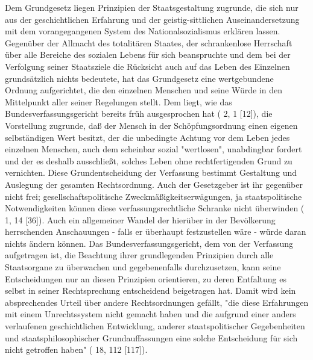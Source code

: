 \documentclass[12pt]{article}
\begin{document}
\syncleft
\begin{sourcepara}
Dem Grundgesetz liegen Prinzipien der Staatsgestaltung zugrunde, die sich nur aus der geschichtlichen Erfahrung und der geistig-sittlichen Auseinandersetzung mit dem vorangegangenen System des Nationalsozialismus erklären lassen. Gegenüber der Allmacht des totalitären Staates, der schrankenlose Herrschaft über alle Bereiche des sozialen Lebens für sich beanspruchte und dem bei der Verfolgung seiner Staatsziele die Rücksicht auch auf das Leben des Einzelnen grundsätzlich nichts bedeutete, hat das Grundgesetz eine wertgebundene Ordnung aufgerichtet, die den einzelnen Menschen und seine Würde in den Mittelpunkt aller seiner Regelungen stellt. Dem liegt, wie das Bundesverfassungsgericht bereits früh ausgesprochen hat (\abbrBVerfGE{} 2, 1 [12]), die Vorstellung zugrunde, daß der Mensch in der Schöpfungsordnung einen eigenen selbständigen Wert besitzt, der die unbedingte Achtung vor dem Leben jedes einzelnen Menschen, auch dem scheinbar sozial "wertlosen", unabdingbar fordert und der es deshalb ausschließt, solches Leben ohne rechtfertigenden Grund zu vernichten. Diese Grundentscheidung der Verfassung bestimmt Gestaltung und Auslegung der gesamten Rechtsordnung. Auch der Gesetzgeber ist ihr gegenüber nicht frei; gesellschaftspolitische Zweckmäßigkeitserwägungen, ja staatspolitische Notwendigkeiten können diese verfassungsrechtliche Schranke nicht überwinden (\abbrBVerfGE{} 1, 14 [36]). Auch ein allgemeiner Wandel der hierüber in der Bevölkerung herrschenden Anschauungen - falls er überhaupt festzustellen wäre - würde daran nichts ändern können. Das Bundesverfassungsgericht, dem von der Verfassung aufgetragen ist, die Beachtung ihrer grundlegenden Prinzipien durch alle Staatsorgane zu überwachen und gegebenenfalls durchzusetzen, kann seine Entscheidungen nur an diesen Prinzipien orientieren, zu deren Entfaltung es selbst in seiner Rechtsprechung entscheidend beigetragen hat. Damit wird kein absprechendes Urteil über andere Rechtsordnungen gefällt, "die diese Erfahrungen mit einem Unrechtssystem nicht gemacht haben und die aufgrund einer anders verlaufenen geschichtlichen Entwicklung, anderer staatspolitischer Gegebenheiten und staatsphilosophischer Grundauffassungen eine solche Entscheidung für sich nicht getroffen haben" (\abbrBVerfGE{} 18, 112 [117]).
\end{sourcepara}
\end{document}
